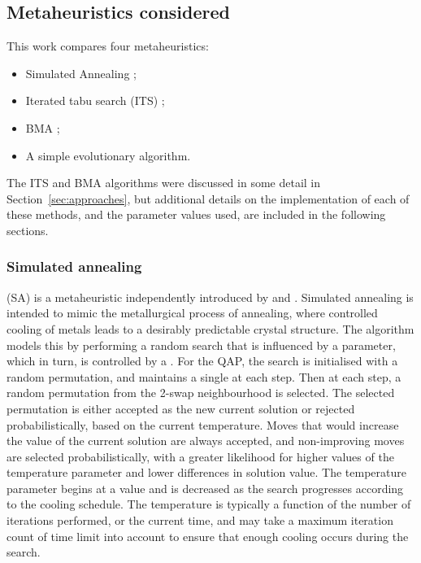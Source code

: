 \subsection{Metaheuristics considered} {
\label{sec:algorithms-considered}
    This work compares four metaheuristics:
    \begin{itemize}
        \item Simulated Annealing \citep{kirkpatrick:1983op, vcerny:1985th};
        \item Iterated tabu search (ITS) \citep{Misevicius:2012dj};
        \item BMA \citep{Benlic:2015gp};
        \item A simple evolutionary algorithm.
    \end{itemize}
    The ITS and BMA algorithms were discussed in some detail in Section~\ref{sec:approaches}, but additional details on the implementation of each of these methods, and the parameter values used, are included in the following sections.


    \subsubsection{Simulated annealing} {
    \label{sec:method-sa}

        { (SA) is a metaheuristic independently introduced by \citet{kirkpatrick:1983op} and \citet{vcerny:1985th}.
        Simulated annealing is intended to mimic the metallurgical process of annealing, where controlled cooling of metals leads to a desirably predictable crystal structure.
        The algorithm models this by performing a random search that is influenced by a  parameter, which in turn, is controlled by a .
        For the QAP, the search is initialised with a random permutation, and maintains a single  at each step.
        Then at each step, a random permutation from the 2-swap neighbourhood is selected.
        The selected permutation is either accepted as the new current solution or rejected probabilistically, based on the current temperature.
        Moves that would increase the value of the current solution are always accepted, and non-improving moves are selected probabilistically, with a greater likelihood for higher values of the temperature parameter and lower differences in solution value.
        The temperature parameter begins at a  value and is decreased as the search progresses according to the cooling schedule. The temperature is typically a function of the number of iterations performed, or the current time, and may take a maximum iteration count of time limit into account to ensure that enough cooling occurs during the search.

}}}
